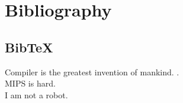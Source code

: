 \documentclass[14pt]{article}
\begin{document}
    \section{Bibliography}
    \subsection{BibTeX}

    Compiler is the greatest invention of mankind. \cite{dragonbook}.\\
    MIPS is hard.
    \cite{mips}\\
    I am not a robot.
    \cite{turing2009computing}
    
    
    
\end{document}
